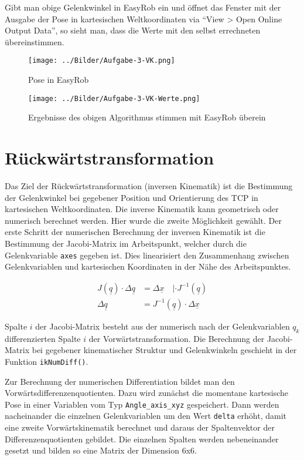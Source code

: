 \documentclass[11pt, a4paper]{article}
\newcommand{\code}{\texttt}
\begin{document}
Gibt man obige Gelenkwinkel in EasyRob ein und öffnet das Fenster mit der Ausgabe der Pose in kartesischen Weltkoordinaten via \enquote{View > Open Online Output Data}, so sieht man, dass die Werte mit den selbst errechneten übereinstimmen.

\begin{figure}[H]
	\texttt{[image: ../Bilder/Aufgabe-3-VK.png]}
	\caption{Pose in EasyRob}
\end{figure}
\begin{figure}[H]
	\center\texttt{[image: ../Bilder/Aufgabe-3-VK-Werte.png]}
	\caption{Ergebnisse des obigen Algorithmus stimmen mit EasyRob überein}
\end{figure}

\section{Rückwärtstransformation}
Das Ziel der Rückwärtstransformation (inversen Kinematik) ist die Bestimmung der Gelenkwinkel bei gegebener Position und Orientierung des TCP in kartesischen Weltkoordinaten. Die inverse Kinematik kann geometrisch oder numerisch berechnet werden. Hier wurde die zweite Möglichkeit gewählt. Der erste Schritt der numerischen Berechnung der inversen Kinematik ist die Bestimmung der Jacobi-Matrix im Arbeitspunkt, welcher durch die Gelenkvariable \code{axes} gegeben ist. Dies linearisiert den Zusammenhang zwischen Gelenkvariablen und kartesischen Koordinaten in der Nähe des Arbeitspunktes.

\begin{eqnarray*}
	J(\underline{q}) \cdot \Delta \underline{q} &= \Delta \underline{x} \quad | \cdot J^{-1}(\underline{q}) \\
	\Delta \underline{q} &= J^{-1}(\underline{q}) \cdot \Delta \underline{x}
\end{eqnarray*} 

Spalte $i$ der Jacobi-Matrix besteht aus der numerisch nach der Gelenkvariablen $q_k$ differenzierten Spalte $i$ der Vorwärtstransformation. Die Berechnung der Jacobi-Matrix bei gegebener kinematischer Struktur und Gelenkwinkeln geschieht in der Funktion \code{ikNumDiff()}.

Zur Berechnung der numerischen Differentiation bildet man den Vorwärtsdifferenzenquotienten. Dazu wird zunächst die momentane kartesische Pose in einer Variablen vom Typ \code{Angle\_axis\_xyz} gespeichert. Dann werden nacheinander die einzelnen Gelenkvariablen um den Wert \code{delta} erhöht, damit eine zweite Vorwärtskinematik berechnet und daraus der Spaltenvektor der Differenzenquotienten gebildet. Die einzelnen Spalten werden nebeneinander gesetzt und bilden so eine Matrix der Dimension 6x6.
\end{document}
